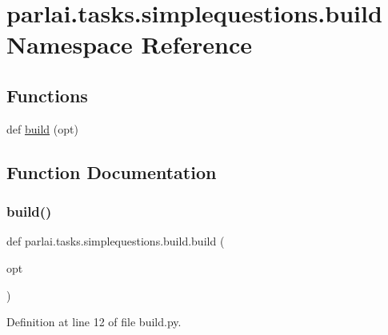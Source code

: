 \hypertarget{namespaceparlai_1_1tasks_1_1simplequestions_1_1build}{}\section{parlai.\+tasks.\+simplequestions.\+build Namespace Reference}
\label{namespaceparlai_1_1tasks_1_1simplequestions_1_1build}
\subsection*{Functions}
\begin{DoxyCompactItemize}
\item 
def \hyperlink{namespaceparlai_1_1tasks_1_1simplequestions_1_1build_adbe26bd28066100d5e756c1b34f8a9b9}{build} (opt)
\end{DoxyCompactItemize}


\subsection{Function Documentation}
\mbox{\label{namespaceparlai_1_1tasks_1_1simplequestions_1_1build_adbe26bd28066100d5e756c1b34f8a9b9}} 
\subsubsection{\texorpdfstring{build()}{build()}}
{\footnotesize\ttfamily def parlai.\+tasks.\+simplequestions.\+build.\+build (\begin{DoxyParamCaption}\item[{}]{opt }\end{DoxyParamCaption})}



Definition at line 12 of file build.\+py.

